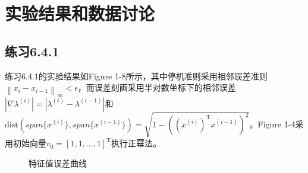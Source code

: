 \documentclass[UTF8,a4paper,10pt]{ctexart}
\begin{document}
\section{实验结果和数据讨论}
    \subsection{练习6.4.1}
        \par
        练习6.4.1的实验结果如Figure 1-8所示，其中停机准则采用相邻误差准则$\left\|x_{i}-x_{i-1}\right\|_{\infty}<\epsilon$，而误差刻画采用半对数坐标下的相邻误差$\left|\nabla\lambda^{(i)}\right|=\left|\lambda^{(i)}-\lambda^{(i-1)}\right|$和$\mathrm{dist}(span\{x^{(i)}\},span\{x^{(i-1)}\})=\sqrt{1-((x^{(i)})^{\mathrm{T}}x^{(i-1)})^2}$。Figure 1-4采用初始向量$v_0=[1,1,\dots,1]^{\mathrm{T}}$执行正幂法。
        \begin{figure}[htbp]
            \centering
            \caption{特征值误差曲线}
        \end{figure}
\end{document}
